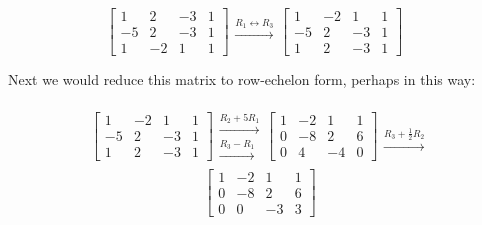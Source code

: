 \documentclass{ximera}
\begin{document}
\begin{exploration}
$$\left[\begin{array}{ccc|c} 
 1&2&-3&1\\-5&2&-3&1\\1&-2&1&1
 \end{array}\right]
 \begin{array}{c}
 \\
 \xrightarrow{R_1\leftrightarrow R_3}\\
\\
 \end{array}
\left[\begin{array}{ccc|c} 
 1&-2&1&1\\-5&2&-3&1\\1&2&-3&1
 \end{array}\right]
 \begin{array}{c}
 \\
\\
\\
 \end{array}$$
 
Next we would reduce this matrix to row-echelon form, perhaps in this way:
 
$$\left[\begin{array}{ccc|c} 
 1&-2&1&1\\-5&2&-3&1\\1&2&-3&1
 \end{array}\right]
 \begin{array}{c}
 \\
 \xrightarrow{R_2+5R_1}\\
 \xrightarrow{R_3-R_1}\\
 \end{array}
\left[\begin{array}{ccc|c} 
 1&-2&1&1\\0&-8&2&6\\0&4&-4&0
 \end{array}\right]
 \begin{array}{c}
 \\
 \\
 \xrightarrow{R_3+\frac{1}{2}R_2}\\
 \end{array}
$$
\begin{equation}\label{eq:ref2}
 \left[\begin{array}{ccc|c} 
 1&-2&1&1\\0&-8&2&6\\0&0&-3&3
 \end{array}\right]
\end{equation}
 

\end{exploration}
\end{document}
